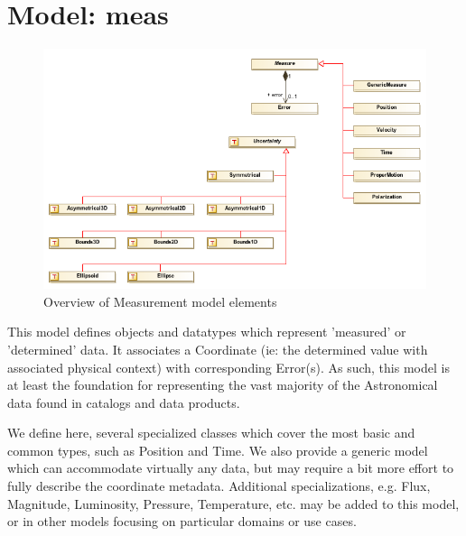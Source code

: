 
%



    
    
    
      

\pagebreak
\section{Model: meas }
  
  \begin{figure}[h]
  \begin{center}
    \includegraphics[width=5.75in]{diagrams/Overview.png}
    \caption{Overview of Measurement model elements}\label{fig:overview}
  \end{center}
  \end{figure}

  This model defines objects and datatypes which represent 'measured' or 'determined' data. It associates a Coordinate (ie: the determined value with associated physical context) with corresponding Error(s). As such, this model is at least the foundation for representing the vast majority of the Astronomical data found in catalogs and data products. 

We define here, several specialized classes which cover the most basic and common types, such as Position and Time. We also provide a generic model which can accommodate virtually any data, but may require a bit more effort to fully describe the coordinate metadata. Additional specializations, e.g. Flux, Magnitude, Luminosity, Pressure, Temperature, etc. may be added to this model, or in other models focusing on particular domains or use cases. 

